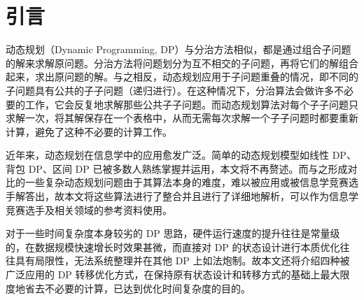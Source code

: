
\chapter{引言}

动态规划（Dynamic Programming, DP）与分治方法相似，都是通过组合子问题的解来求解原问题。分治方法将问题划分为互不相交的子问题，再将它们的解组合起来，求出原问题的解。与之相反，动态规划应用于子问题重叠的情况，即不同的子问题具有公共的子子问题（递归进行）。在这种情况下，分治算法会做许多不必要的工作，它会反复地求解那些公共子子问题。而动态规划算法对每个子子问题只求解一次，将其解保存在一个表格中，从而无需每次求解一个子子问题时都要重新计算，避免了这种不必要的计算工作。
\cite{2001Introduction}

近年来，动态规划在信息学中的应用愈发广泛。简单的动态规划模型如线性 DP、背包
DP、区间 DP
已被多数人熟练掌握并运用，本文将不再赘述。而与之形成对比的一些复杂动态规划问题由于其算法本身的难度，难以被应用或被信息学竞赛选手解答出，故本文将这些算法进行了整合并且进行了详细地解析，可以作为信息学竞赛选手及相关领域的参考资料使用。

对于一些时间复杂度本身较劣的 DP
思路，硬件运行速度的提升往往是常量级的，在数据规模快速增长时效果甚微，而直接对
DP 的状态设计进行本质优化往往具有局限性，无法系统整理并在其他 DP
上如法炮制。故本文还将介绍四种被广泛应用的 DP
转移优化方式，在保持原有状态设计和转移方式的基础上最大限度地省去不必要的计算，已达到优化时间复杂度的目的。
